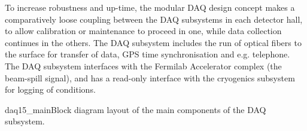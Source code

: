 To increase
robustness and up-time, the modular DAQ design concept makes a
comparatively loose coupling between the DAQ subsystems in each
detector hall, to allow calibration or maintenance to proceed in one,
while data collection continues in the others.  The DAQ subsystem
includes the run of optical fibers to the surface for transfer of data,
GPS time synchronisation and e.g. telephone.  The DAQ subsystem
interfaces with the Fermilab Accelerator complex (the beam-spill
signal), and has a read-only interface with the cryogenics subsystem
for logging of conditions.  

\begin{cdrfigure}{daq15_main}{Block diagram layout of the main
    components of the DAQ subsystem.}
\end{cdrfigure}
